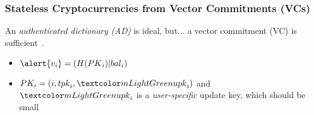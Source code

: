 \begin{frame}
    \frametitle{Stateless Cryptocurrencies from Vector Commitments (VCs)}

    \small
    \pause
    An \textit{authenticated dictionary (AD)} is ideal, but...\pause\xspace
    a \alert{vector commitment (VC)} is sufficient~\cite{CPZ18}.\pause\xspace
    \begin{itemize}
        \item $\alert{v_i} = (H(\PK_i)|\bal_i)$
        \item $PK_i = (i,\tpk_i, \upk_i)$ and $\upk_i$ is a \textit{user-specific} \alert{update key}, which should be small\pause
    \end{itemize}


\end{frame}
